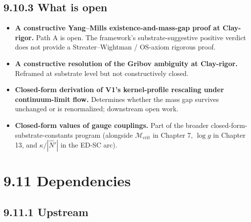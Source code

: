 \documentclass[11pt]{book}
\begin{document}
\subsection{9.10.3 What is open}

\begin{itemize}
\item \textbf{A constructive Yang–Mills existence-and-mass-gap proof at Clay-rigor.} Path A is open. The framework's substrate-suggestive positive verdict does not provide a Streater–Wightman / OS-axiom rigorous proof.
\item \textbf{A constructive resolution of the Gribov ambiguity at Clay-rigor.} Reframed at substrate level but not constructively closed.
\item \textbf{Closed-form derivation of V1's kernel-profile rescaling under continuum-limit flow.} Determines whether the mass gap survives unchanged or is renormalized; downstream open work.
\item \textbf{Closed-form values of gauge couplings.} Part of the broader closed-form-substrate-constants program (alongside $\mathcal{M}_\mathrm{crit}$ in Chapter 7, $\log g$ in Chapter 13, and $\kappa/|\hat{N}'|$ in the ED-SC arc).
\end{itemize}

\section{9.11 Dependencies}

\subsection{9.11.1 Upstream}
\end{document}
